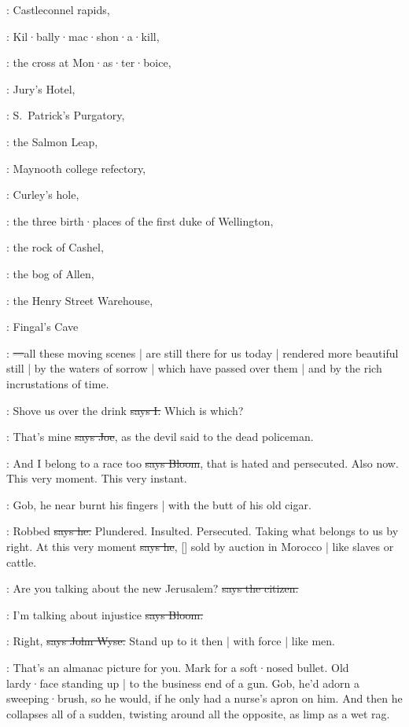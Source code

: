:
Castleconnel rapids,

:
Kil·bally·mac·shon·a·kill,

:
the cross at Mon·as·ter·boice,

:
Jury's Hotel,

:
S.~Patrick's Purgatory,

:
the Salmon Leap,

:
Maynooth college refectory,

:
Curley's hole,

:
the three birth·places of the first duke of Wellington,

:
the rock of Cashel,

:
the bog of Allen,

:
the Henry Street Warehouse,

:
Fingal's Cave

:
\sout{---}all these moving scenes |
are still there for us today |
rendered more beautiful still |
by the waters of sorrow |
which have passed over them |
and by the rich incrustations of time.

:
Shove us over the drink
\sout{says I.}
Which is which?

\joe:
That's mine
\sout{says Joe},
as the devil said to the dead policeman.

\Bloom:
And I belong to a race too
\sout{says Bloom},
that is hated and persecuted.
Also now.
This very moment.
This very instant.

\Nq:
Gob,
he near burnt his fingers |
with the butt of his old cigar.

\Bloom:
Robbed
\sout{says he.}
Plundered.
Insulted.
Persecuted.
Taking what belongs to us by right.
At this very moment
\sout{says he},
[]
sold by auction in Morocco |
like slaves or cattle.

\citizen:
Are you talking about the new Jerusalem?
\sout{says the citizen.}

\Bloom:
I'm talking about injustice
\sout{says Bloom.}

\johnwyse:
Right,
\sout{says John Wyse.}
Stand up to it then |
with force |
like men.

\Nq:
That's an almanac picture for you.
Mark for a soft·nosed bullet.
Old lardy·face standing up |
to the business end of a gun.
Gob,
he'd adorn a sweeping·brush,
so he would,
if he only had a nurse's apron on him.
And then he collapses all of a sudden,
twisting around all the opposite,
as limp as a wet rag.%

